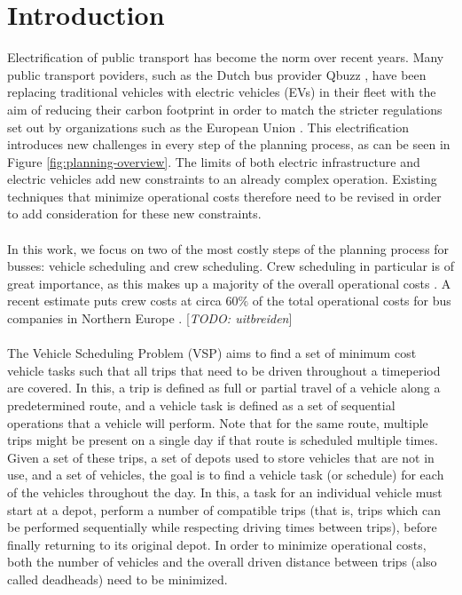 \documentclass[]{article}
\newcommand{\todo}[1]{{\color{red}[\textit{TODO: #1}]}}
\begin{document}
\section{Introduction}
Electrification  of public transport has become the norm over recent years. Many public transport poviders, such as the Dutch bus provider Qbuzz \cite{qbuzzQbuzz}, have been replacing traditional vehicles with electric vehicles (EVs) in their fleet with the aim of reducing their carbon footprint in order to match the stricter regulations set out by organizations such as the European Union \cite{europaRegulation20181999}. This electrification introduces new challenges in every step of the planning process, as can be seen in Figure \ref{fig:planning-overview}. The limits of both electric infrastructure and electric vehicles add new constraints to an already complex operation. Existing techniques that minimize operational costs therefore need to be revised in order to add consideration for these new constraints. \\\\
In this work, we focus on two of the most costly steps of the planning process for busses: vehicle scheduling and crew scheduling. Crew scheduling in particular is of great importance, as this makes up a majority of the overall operational costs \cite{RAFF198363}. A recent estimate puts crew costs at circa $60\%$ of the total operational costs for bus companies in Northern Europe \cite{PERUMAL2019280}. \todo{uitbreiden} \\\\
The Vehicle Scheduling Problem (VSP) aims to find a set of minimum cost vehicle tasks such that all trips that need to be driven throughout a timeperiod are covered. In this, a trip is defined as full or partial travel of a vehicle along a predetermined route, and a vehicle task is defined as a set of sequential operations that a vehicle will perform. Note that for the same route, multiple trips might be present on a single day if that route is scheduled multiple times. \\
Given a set of these trips, a set of depots used to store vehicles that are not in use, and a set of vehicles, the goal is to find a vehicle task (or schedule) for each of the vehicles throughout the day. In this, a task for an individual vehicle must start at a depot, perform a number of compatible trips (that is, trips which can be performed sequentially while respecting driving times between trips), before finally returning to its original depot. In order to minimize operational costs, both the number of vehicles and the overall driven distance between trips (also called deadheads) need to be minimized. \\
\end{document}
